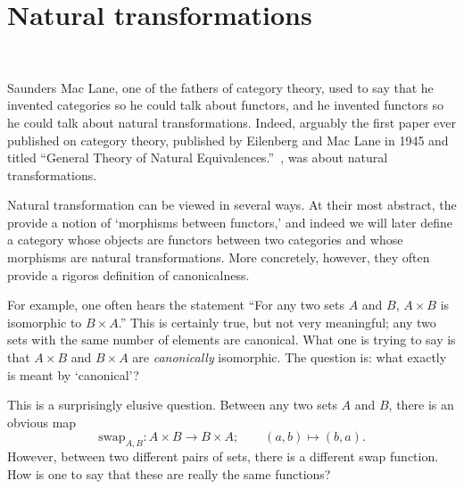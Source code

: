 \documentclass[notes.tex]{subfiles}
\begin{document}
\section{Natural transformations}~\label{sec:naturaltransformations}

Saunders Mac Lane, one of the fathers of category theory, used to say that he invented categories so he could talk about functors, and he invented functors so he could talk about natural transformations. Indeed, arguably the first paper ever published on category theory, published by Eilenberg and Mac Lane in 1945 and titled ``General Theory of Natural Equivalences.''~\cite{awodey-intro-to-categories}, was about natural transformations.

Natural transformation can be viewed in several ways. At their most abstract, the provide a notion of `morphisms between functors,' and indeed we will later define a category whose objects are functors between two categories and whose morphisms are natural transformations. More concretely, however, they often provide a rigoros definition of canonicalness.

For example, one often hears the statement ``For any two sets $A$ and $B$, $A \times B$ is isomorphic to $B \times A$.'' This is certainly true, but not very meaningful; any two sets with the same number of elements are canonical. What one is trying to say is that $A \times B$ and $B \times A$ are \emph{canonically} isomorphic. The question is: what exactly is meant by `canonical'?

This is a surprisingly elusive question. Between any two sets $A$ and $B$, there is an obvious map
\begin{equation*}
  \mathrm{swap}_{A,B}\colon A \times B \to B \times A; \qquad (a, b) \mapsto (b, a).
\end{equation*}
However, between two different pairs of sets, there is a different swap function. How is one to say that these are really the same functions?
\end{document}
